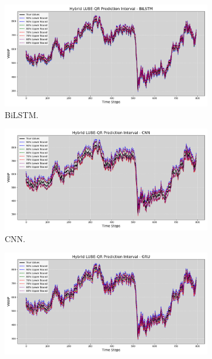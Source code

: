 \begin{figure}[H]
    \centering
    \begin{minipage}{0.49\textwidth}
        \centering
        \begin{subfigure}[b]{\textwidth}
            \centering
            \includegraphics[width=\textwidth]{Chap03/figs/Hybrid_LUBE_QR_AllConfidence_axisbank_BiLSTM.png}
            \caption{BiLSTM.}
        \end{subfigure}
        \hfill
        \begin{subfigure}[b]{\textwidth}
            \centering
            \includegraphics[width=\textwidth]{Chap03/figs/Hybrid_LUBE_QR_AllConfidence_axisbank_CNN.png}
            \caption{CNN.}
        \end{subfigure}
        \begin{subfigure}[b]{\textwidth}
            \centering
            \includegraphics[width=\textwidth]{Chap03/figs/Hybrid_LUBE_QR_AllConfidence_axisbank_GRU.png}

\end{subfigure}
\end{minipage}
\end{figure}
